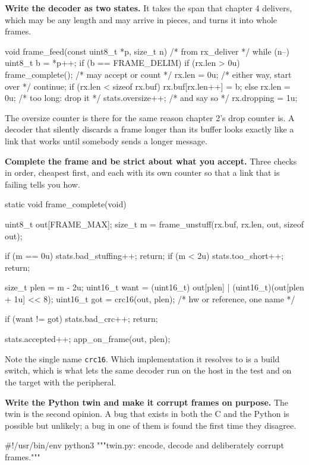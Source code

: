 \begin{steps}
\item \textbf{Write the decoder as two states.} It takes the span that chapter
4 delivers, which may be any length and may arrive in pieces, and turns it into
whole frames.
\begin{ccode}
void frame_feed(const uint8_t *p, size_t n)     /* from rx_deliver */
{
    while (n--) {
        uint8_t b = *p++;
        if (b == FRAME_DELIM) {
            if (rx.len > 0u)
                frame_complete();               /* may accept or count   */
            rx.len = 0u;                        /* either way, start over */
            continue;
        }
        if (rx.len < sizeof rx.buf) {
            rx.buf[rx.len++] = b;
        } else {
            rx.len = 0u;                        /* too long: drop it     */
            stats.oversize++;                   /* and say so            */
            rx.dropping = 1u;
        }
    }
}
\end{ccode}
The oversize counter is there for the same reason chapter 2's drop counter is.
A decoder that silently discards a frame longer than its buffer looks exactly
like a link that works until somebody sends a longer message.

\item \textbf{Complete the frame and be strict about what you accept.} Three
checks in order, cheapest first, and each with its own counter so that a link
that is failing tells you how.
\begin{ccode}
static void frame_complete(void)
{
    uint8_t out[FRAME_MAX];
    size_t  m = frame_unstuff(rx.buf, rx.len, out, sizeof out);

    if (m == 0u)               { stats.bad_stuffing++; return; }
    if (m < 2u)                { stats.too_short++;    return; }

    size_t   plen = m - 2u;
    uint16_t want = (uint16_t) out[plen] | (uint16_t)(out[plen + 1u] << 8);
    uint16_t got  = crc16(out, plen);       /* hw or reference, one name */

    if (want != got)           { stats.bad_crc++;      return; }

    stats.accepted++;
    app_on_frame(out, plen);
}
\end{ccode}
Note the single name \texttt{crc16}. Which implementation it resolves to is a
build switch, which is what lets the same decoder run on the host in the test
and on the target with the peripheral.

\item \textbf{Write the Python twin and make it corrupt frames on purpose.}
The twin is the second opinion. A bug that exists in both the C and the Python
is possible but unlikely; a bug in one of them is found the first time they
disagree.
\begin{pycode}
#!/usr/bin/env python3
"""twin.py: encode, decode and deliberately corrupt frames."""


\end{pycode}
\end{steps}
